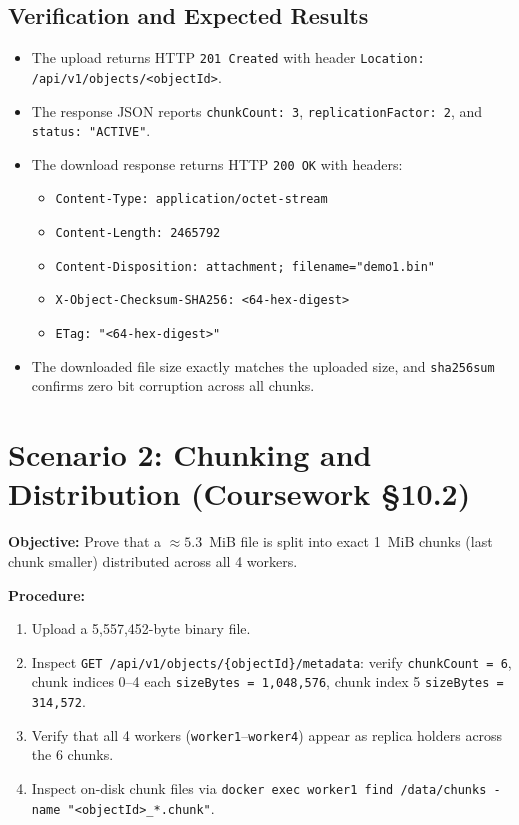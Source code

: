 \documentclass[12pt,a4paper]{report}
\begin{document}
\subsection{Verification and Expected Results}
\begin{itemize}[leftmargin=*]
  \item The upload returns HTTP \texttt{201 Created} with header \texttt{Location: /api/v1/objects/<objectId>}.
  \item The response JSON reports \texttt{chunkCount: 3}, \texttt{replicationFactor: 2}, and \texttt{status: "ACTIVE"}.
  \item The download response returns HTTP \texttt{200 OK} with headers:
    \begin{itemize}
      \item \texttt{Content-Type: application/octet-stream}
      \item \texttt{Content-Length: 2465792}
      \item \texttt{Content-Disposition: attachment; filename="demo1.bin"}
      \item \texttt{X-Object-Checksum-SHA256: <64-hex-digest>}
      \item \texttt{ETag: "<64-hex-digest>"}
    \end{itemize}
  \item The downloaded file size exactly matches the uploaded size, and \texttt{sha256sum} confirms zero bit corruption across all chunks.
\end{itemize}

\section{Scenario 2: Chunking and Distribution (Coursework \S10.2)}
\label{sec:demo-10-2}

\textbf{Objective:} Prove that a $\approx 5.3$~MiB file is split into exact 1~MiB chunks (last chunk smaller) distributed across all 4 workers.

\textbf{Procedure:}
\begin{enumerate}
  \item Upload a 5,557,452-byte binary file.
  \item Inspect \texttt{GET /api/v1/objects/\{objectId\}/metadata}: verify \texttt{chunkCount = 6}, chunk indices 0--4 each \texttt{sizeBytes = 1,048,576}, chunk index 5 \texttt{sizeBytes = 314,572}.
  \item Verify that all 4 workers (\texttt{worker1}--\texttt{worker4}) appear as replica holders across the 6 chunks.
  \item Inspect on-disk chunk files via \texttt{docker exec worker1 find /data/chunks -name "<objectId>\_*.chunk"}.
\end{enumerate}
\end{document}
